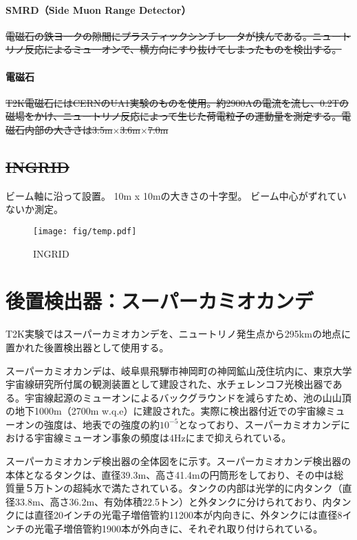 \paragraph{SMRD（Side Muon Range Detector）}
\sout{電磁石の鉄ヨークの隙間にプラスティックシンチレータが挟んである。ニュートリノ反応によるミューオンで、横方向にすり抜けてしまったものを検出する。}

\paragraph{電磁石}
\sout{T2K電磁石にはCERNのUA1実験のものを使用。約2900Aの電流を流し、0.2Tの磁場をかけ、ニュートリノ反応によって生じた荷電粒子の運動量を測定する。電磁石内部の大きさは3.5m$\times$3.6m$\times$7.0m}

\fi


\subsection{\sout{INGRID}}
ビーム軸に沿って設置。
10m x 10mの大きさの十字型。
ビーム中心がずれていないか測定。

\begin{figure}[htb]
\centering
\texttt{[image: fig/temp.pdf]}
\caption[INGRID]{INGRID}
\label{INGRID}
\end{figure}

\fi %


\newpage
\section{後置検出器：スーパーカミオカンデ}

T2K実験ではスーパーカミオカンデを、ニュートリノ発生点から295kmの地点に置かれた後置検出器として使用する。

スーパーカミオカンデは、岐阜県飛騨市神岡町の神岡鉱山茂住坑内に、東京大学宇宙線研究所付属の観測装置として建設された、水チェレンコフ光検出器である。宇宙線起源のミューオンによるバックグラウンドを減らすため、池の山山頂の地下1000m（2700m w.q.e）に建設された。実際に検出器付近での宇宙線ミューオンの強度は、地表での強度の約$10^{-5}$となっており、スーパーカミオカンデにおける宇宙線ミューオン事象の頻度は4Hzにまで抑えられている。

スーパーカミオカンデ検出器の全体図をに示す。スーパーカミオカンデ検出器の本体となるタンクは、直径39.3m、高さ41.4mの円筒形をしており、その中は総質量５万トンの超純水で満たされている。タンクの内部は光学的に内タンク（直径33.8m、高さ36.2m、有効体積22.5トン）と外タンクに分けられており、内タンクには直径20インチの光電子増倍管約11200本が内向きに、外タンクには直径8インチの光電子増倍管約1900本が外向きに、それぞれ取り付けられている。

